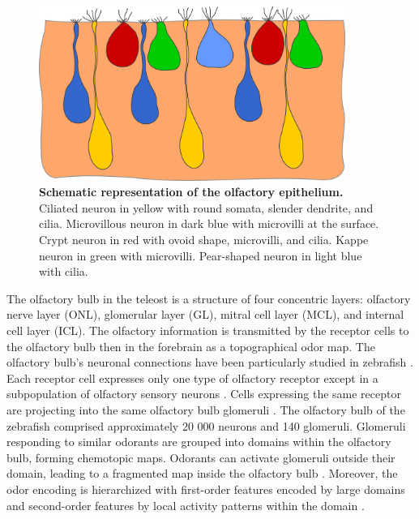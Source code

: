     \begin{figure}[h]
      \centering
      \includegraphics[width=10cm]{part_2/assets/olfactory_schematic_full.png}
      \caption{{\bf Schematic representation of the olfactory epithelium.} Ciliated neuron in yellow with round somata, slender dendrite, and cilia. Microvillous neuron in dark blue with microvilli at the surface. Crypt neuron in red with ovoid shape, microvilli, and cilia. Kappe neuron in green with microvilli. Pear-shaped neuron in light blue with cilia.}
      \label{olfactory_schematic_full}
    \end{figure}

    The olfactory bulb in the teleost is a structure of four concentric layers: olfactory nerve layer (ONL), glomerular layer (GL), mitral cell layer (MCL), and internal cell layer (ICL). The olfactory information is transmitted by the receptor cells to the olfactory bulb \cite{nikonov2001electrophysiological} then in the forebrain \cite{nikonov2005beyond} as a topographical odor map. The olfactory bulb's neuronal connections have been particularly studied in zebrafish \cite{hansen1998peripheral,kermen2013neural}. Each receptor cell expresses only one type of olfactory receptor \cite{serizawa2004one,barth1997noncoordinate,weth1996nested,sato2007hierarchical} except in a subpopulation of olfactory sensory neurons \cite{sato2007hierarchical}. Cells expressing the same receptor are projecting into the same olfactory bulb glomeruli \cite{sato2005mutually}. The olfactory bulb of the zebrafish comprised approximately 20 000 neurons \cite{friedrich2009processing} and 140 glomeruli\cite{braubach2012distribution}. Glomeruli responding to similar odorants are grouped into domains within the olfactory bulb, forming chemotopic maps. Odorants can activate glomeruli outside their domain, leading to a fragmented map inside the olfactory bulb \cite{friedrich1998chemotopic}. Moreover, the odor encoding is hierarchized with first-order features encoded by large domains and second-order features by local activity patterns within the domain \cite{fuss2001odorant,korsching2001odor}.

